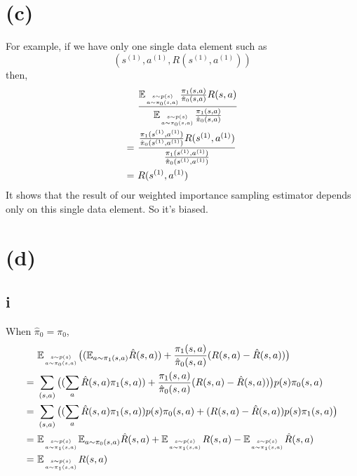 \documentclass[11pt, a4paper]{article}
\begin{document}
    \section*{(c)}
    For example, if we have only one single data element such as
    $$(s^{(1)}, a^{(1)}, R(s^{(1)}, a^{(1)}))$$
    then,
    \begin{align*}
        & \ \frac{
            \mathbb{E}_{\genfrac{}{}{0pt}{2}{s \sim p(s)}{a \sim \pi_0(s,a)}}
            \frac{\pi_1 (s, a)}{\hat{\pi}_0 (s,a)} R(s,a)
        }{
            \mathbb{E}_{\genfrac{}{}{0pt}{2}{s \sim p(s)}{a \sim \pi_0(s,a)}}
            \frac{\pi_1 (s, a)}{\hat{\pi}_0 (s,a)}
        } \\
        = & \ \frac{
            \frac{\pi_1 (s^{(1)}, a^{(1)})}{\hat{\pi}_0 (s^{(1)},a^{(1)})} R(s^{(1)},a^{(1)})
        }{
            \frac{\pi_1 (s^{(1)}, a^{(1)})}{\hat{\pi}_0 (s^{(1)},a^{(1)})}
        } \\
        = & \ R(s^{(1)},a^{(1)})
    \end{align*}
    It shows that the result of our weighted importance sampling estimator depends only on this single data element.
    So it's biased.

    \section*{(d)}

    \subsection*{i}
    When $\hat{\pi}_0 = \pi_0$,
    \begin{align*}
        & \ \mathbb{E}_{\genfrac{}{}{0pt}{2}{s \sim p(s)}{a \sim \pi_0(s,a)}}
        \big(
            (\mathbb{E}_{a \sim \pi_1(s,a)} \hat{R}(s,a))
            + \frac{\pi_1(s,a)}{\hat{\pi}_0(s,a)} (R(s,a) - \hat{R}(s,a))
        \big) \\
        = & \ \sum_{(s,a)} \big(
            (\sum_a \hat{R}(s,a) \pi_1(s,a))
            + \frac{\pi_1(s,a)}{\hat{\pi}_0(s,a)} (R(s,a) - \hat{R}(s,a))
        \big) p(s) \pi_0(s,a) \\
        = & \ \sum_{(s,a)} \big(
            (\sum_a \hat{R}(s,a) \pi_1(s,a)) p(s) \pi_0(s,a)
            + (R(s,a) - \hat{R}(s,a)) p(s) \pi_1(s,a)
        \big) \\
        = & \ \mathbb{E}_{\genfrac{}{}{0pt}{2}{s \sim p(s)}{a \sim \pi_1(s,a)}}
        \mathbb{E}_{a \sim \pi_0(s,a)} \hat{R}(s,a)
        + \mathbb{E}_{\genfrac{}{}{0pt}{2}{s \sim p(s)}{a \sim \pi_1(s,a)}}
        R(s,a)
        - \mathbb{E}_{\genfrac{}{}{0pt}{2}{s \sim p(s)}{a \sim \pi_1(s,a)}}
        \hat{R}(s,a) \\
        = & \ \mathbb{E}_{\genfrac{}{}{0pt}{2}{s \sim p(s)}{a \sim \pi_1(s,a)}} R(s,a)
    \end{align*}
\end{document}
